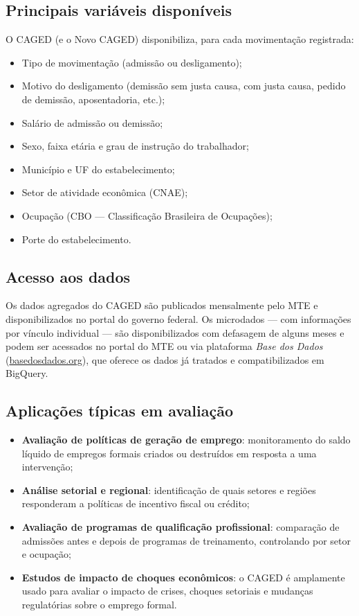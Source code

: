 \subsection{Principais variáveis disponíveis}

O CAGED (e o Novo CAGED) disponibiliza, para cada movimentação registrada:

\begin{itemize}
  \item Tipo de movimentação (admissão ou desligamento);
  \item Motivo do desligamento (demissão sem justa causa, com justa causa, pedido de demissão, aposentadoria, etc.);
  \item Salário de admissão ou demissão;
  \item Sexo, faixa etária e grau de instrução do trabalhador;
  \item Município e UF do estabelecimento;
  \item Setor de atividade econômica (CNAE);
  \item Ocupação (CBO — Classificação Brasileira de Ocupações);
  \item Porte do estabelecimento.
\end{itemize}

\subsection{Acesso aos dados}

Os dados agregados do CAGED são publicados mensalmente pelo MTE e disponibilizados no portal do governo federal. Os microdados — com informações por vínculo individual — são disponibilizados com defasagem de alguns meses e podem ser acessados no portal do MTE ou via plataforma \textit{Base dos Dados} (\url{basedosdados.org}), que oferece os dados já tratados e compatibilizados em BigQuery.

\subsection{Aplicações típicas em avaliação}

\begin{itemize}
  \item \textbf{Avaliação de políticas de geração de emprego}: monitoramento do saldo líquido de empregos formais criados ou destruídos em resposta a uma intervenção;
  \item \textbf{Análise setorial e regional}: identificação de quais setores e regiões responderam a políticas de incentivo fiscal ou crédito;
  \item \textbf{Avaliação de programas de qualificação profissional}: comparação de admissões antes e depois de programas de treinamento, controlando por setor e ocupação;
  \item \textbf{Estudos de impacto de choques econômicos}: o CAGED é amplamente usado para avaliar o impacto de crises, choques setoriais e mudanças regulatórias sobre o emprego formal.
\end{itemize}

